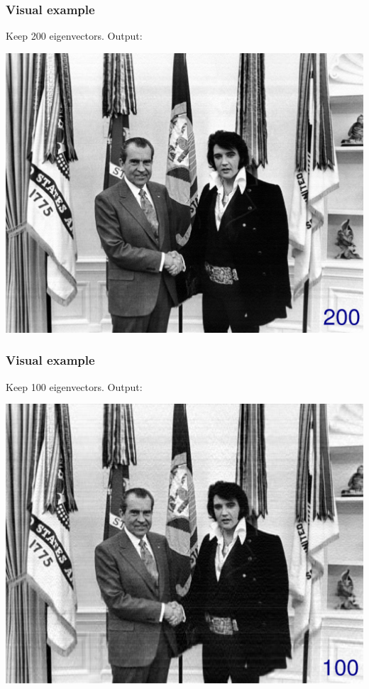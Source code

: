 \documentclass[serif, 12pt]{beamer}
\begin{document}

\begin{frame}

\frametitle{Visual example}
Keep 200 eigenvectors. Output:

\begin{center}
\includegraphics[width=\textheight]{out-200}
\end{center}

\end{frame}


\begin{frame}

\frametitle{Visual example}
Keep 100 eigenvectors. Output:

\begin{center}
\includegraphics[width=\textheight]{out-100}
\end{center}

\end{frame}
\end{document}
